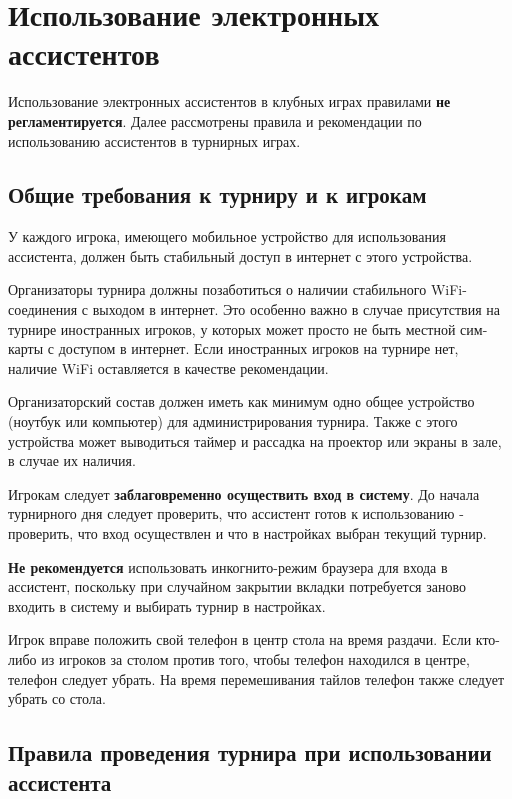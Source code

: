 \section{Использование электронных ассистентов}

Использование электронных ассистентов в клубных играх правилами \textbf{не регламентируется}. Далее рассмотрены правила и рекомендации по использованию ассистентов в турнирных играх.

\subsection{Общие требования к турниру и к игрокам}

У каждого игрока, имеющего мобильное устройство для использования ассистента, должен быть стабильный доступ в интернет с этого устройства.

Организаторы турнира должны позаботиться о наличии стабильного WiFi-соединения с выходом в интернет. Это особенно важно в случае присутствия на турнире иностранных игроков, у которых может просто не быть местной сим-карты с доступом в интернет. Если иностранных игроков на турнире нет, наличие WiFi оставляется в качестве рекомендации.

Организаторский состав должен иметь как минимум одно общее устройство (ноутбук или компьютер) для администрирования турнира. Также с этого устройства может выводиться таймер и рассадка на проектор или экраны в зале, в случае их наличия.

Игрокам следует \textbf{заблаговременно осуществить вход в систему}. До начала турнирного дня следует проверить, что ассистент готов к использованию - проверить, что вход осуществлен и что в настройках выбран текущий турнир.

\textbf{Не рекомендуется} использовать инкогнито-режим браузера для входа в ассистент, поскольку при случайном закрытии вкладки потребуется заново входить в систему и выбирать турнир в настройках.

Игрок вправе положить свой телефон в центр стола на время раздачи. Если кто-либо из игроков за столом против того, чтобы телефон находился в центре, телефон следует убрать. На время перемешивания тайлов телефон также следует убрать со стола.

\subsection{Правила проведения турнира при использовании ассистента}

